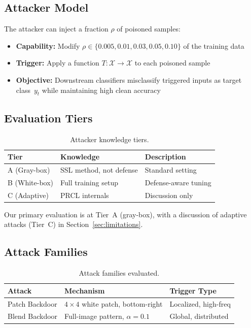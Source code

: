 \documentclass[11pt,a4paper]{article}
\begin{document}
\subsection{Attacker Model}

The attacker can inject a fraction $\rho$ of poisoned samples:
\begin{itemize}[nosep]
  \item \textbf{Capability:} Modify
    $\rho\in\{0.005,0.01,0.03,0.05,0.10\}$ of the training data
  \item \textbf{Trigger:} Apply a function $T:\mathcal{X}\to\mathcal{X}$ to
    each poisoned sample
  \item \textbf{Objective:} Downstream classifiers misclassify triggered inputs
    as target class~$y_t$ while maintaining high clean accuracy
\end{itemize}

\subsection{Evaluation Tiers}

\begin{table}[h]
\centering
\caption{Attacker knowledge tiers.}
\begin{tabular}{@{}lll@{}}
\toprule
\textbf{Tier} & \textbf{Knowledge} & \textbf{Description} \\
\midrule
A (Gray-box)  & SSL method, not defense & Standard setting \\
B (White-box) & Full training setup      & Defense-aware tuning \\
C (Adaptive)  & PRCL internals           & Discussion only \\
\bottomrule
\end{tabular}
\label{tab:tiers}
\end{table}

Our primary evaluation is at Tier~A (gray-box), with a discussion of adaptive
attacks (Tier~C) in Section~\ref{sec:limitations}.

\subsection{Attack Families}

\begin{table}[h]
\centering
\caption{Attack families evaluated.}
\begin{tabular}{@{}lll@{}}
\toprule
\textbf{Attack} & \textbf{Mechanism} & \textbf{Trigger Type} \\
\midrule
Patch Backdoor & $4\!\times\!4$ white patch, bottom-right & Localized, high-freq \\
Blend Backdoor & Full-image pattern, $\alpha=0.1$         & Global, distributed \\
\bottomrule
\end{tabular}
\label{tab:attacks}
\end{table}
\end{document}

